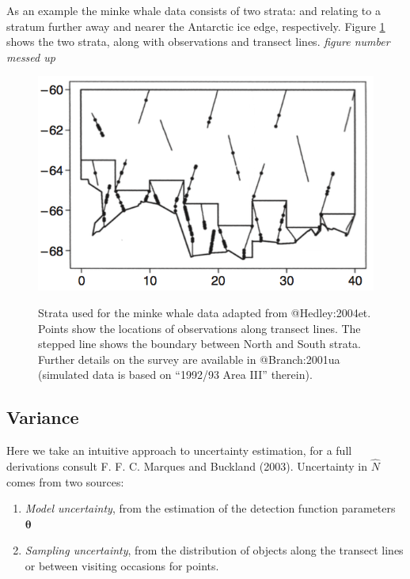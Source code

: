 \documentclass[article]{jss}
\begin{document}
As an example the minke whale data consists of two strata: 
and  relating to a stratum further away and nearer the
Antarctic ice edge, respectively. Figure \ref{fig:minke-strata} shows
the two strata, along with observations and transect lines. \emph{figure
number messed up}

\begin{figure}
\includegraphics{minke-strata}
\label{fig:minke-strata}
\caption{Strata used for the minke whale data adapted from @Hedley:2004et. Points show the locations of observations along transect lines. The stepped line shows the boundary between North and South strata. Further details on the survey are available in @Branch:2001ua (simulated data is based on ``1992/93 Area III'' therein).}
\end{figure}

\subsection{Variance}\label{variance}

Here we take an intuitive approach to uncertainty estimation, for a full
derivations consult F. F. C. Marques and Buckland (2003). Uncertainty in
\(\hat{N}\) comes from two sources:

\begin{enumerate}
\def\labelenumi{\arabic{enumi}.}
\itemsep1pt\parskip0pt
\item
  \emph{Model uncertainty}, from the estimation of the detection
  function parameters \(\boldsymbol{\theta}\)
\item
  \emph{Sampling uncertainty}, from the distribution of objects along
  the transect lines or between visiting occasions for points.
\end{enumerate}
\end{document}
